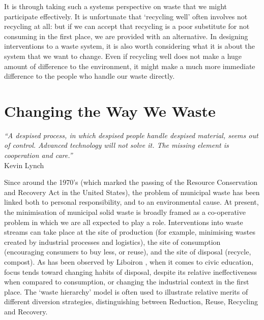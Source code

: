 \documentclass[nofonts,nols,justified,nobib]{tufte-book}
\begin{document}
It is through taking such a systems perspective on waste that we might participate effectively. It is unfortunate that `recycling well' often involves not recycling at all: but if we can accept that recycling is a poor substitute for not consuming in the first place, we are provided with an alternative. In designing interventions to a waste system, it is also worth considering what it is about the system that we want to change. Even if recycling well does not make a huge amount of difference to the environment, it might make a much more immediate difference to the people who handle our waste directly.

\section*{Changing the Way We Waste}

\begin{flushright}
\begin{flushright}
\emph{``A despised process, in which despised people handle despised material, seems out of control. Advanced technology will not solve it. The missing element is cooperation and care.''}\cite{lynch_wasting_1990}\\ Kevin Lynch
\end{flushright}
\end{flushright}


Since around the 1970's (which marked the passing of the Resource Conservation and Recovery Act in the United States), the problem of municipal waste has been linked both to personal responsibility, and to an environmental cause. At present, the minimisation of municipal solid waste is broadly framed as a co-operative problem in which we are all expected to play a role. Interventions into waste streams can take place at the site of production (for example, minimising wastes created by industrial processes and logistics), the site of consumption (encouraging consumers to buy less, or reuse), and the site of disposal (recycle, compost). As has been observed by Liboiron \cite{liboiron_against_2014}, when it comes to civic education, focus tends toward changing habits of disposal, despite its relative ineffectiveness when compared to consumption, or changing the industrial context in the first place. The `waste hierarchy' model is often used to illustrate relative merits of different diversion strategies, distinguishing between Reduction, Reuse, Recycling and Recovery.
\end{document}
